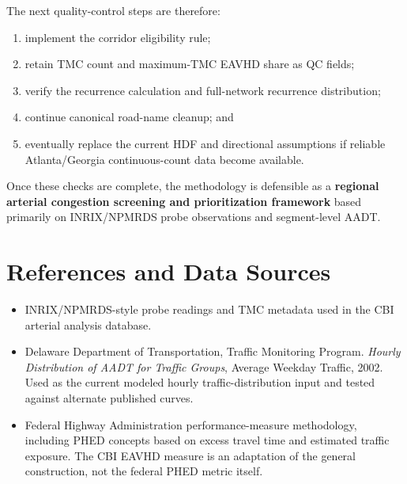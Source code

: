 \documentclass[11pt]{article}
\begin{document}
The next quality-control steps are therefore:

\begin{enumerate}
    \item implement the corridor eligibility rule;
    \item retain TMC count and maximum-TMC EAVHD share as QC fields;
    \item verify the recurrence calculation and full-network recurrence distribution;
    \item continue canonical road-name cleanup; and
    \item eventually replace the current HDF and directional assumptions if reliable Atlanta/Georgia continuous-count data become available.
\end{enumerate}

Once these checks are complete, the methodology is defensible as a \textbf{regional arterial congestion screening and prioritization framework} based primarily on INRIX/NPMRDS probe observations and segment-level AADT.

\section*{References and Data Sources}

\begin{itemize}
    \item INRIX/NPMRDS-style probe readings and TMC metadata used in the CBI arterial analysis database.
    \item Delaware Department of Transportation, Traffic Monitoring Program. \emph{Hourly Distribution of AADT for Traffic Groups}, Average Weekday Traffic, 2002. Used as the current modeled hourly traffic-distribution input and tested against alternate published curves.
    \item Federal Highway Administration performance-measure methodology, including PHED concepts based on excess travel time and estimated traffic exposure. The CBI EAVHD measure is an adaptation of the general construction, not the federal PHED metric itself.
\end{itemize}
\end{document}
